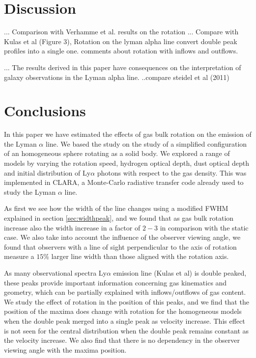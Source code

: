 \documentclass[usenatbib]{mn2e}
\begin{document}
\section{Discussion}
\label{sec:discussion}

... Comparison with Verhamme et al. results on the rotation
... Compare with Kulas et al (Figure 3), Rotation on the lyman alpha
line convert double peak profiles into a single one. comments about
rotation with inflows and outflows.  

... The results derived in this paper have consequences on the
interpretation of galaxy observations in the Lyman alpha line.
..compare steidel et al (2011)



\section{Conclusions}
In this paper we have estimated the effects of gas bulk rotation on
the emission  of the Lyman $\alpha$ line. We based the study on the
study of a simplified configuration of an homogeneous sphere rotating
as a solid body. We explored  a range of models by varying the
rotation speed, hydrogen optical depth, dust optical depth and initial
distribution of Ly$\alpha$ photons with respect to the gas
density. This was implemented in CLARA, a Monte-Carlo
radiative transfer code already used to study the Lyman $\alpha$
line. 

As first we see how the width of the line changes using a modified FWHM
explained in section \ref{sec:widthpeak}, and we found that as gas bulk 
rotation increase also the width increase in a factor of $2-3$ in comparison 
with the static case. We also take into account the influence of the observer 
viewing angle, we found that observers with a line of sight perpendicular  
to the axis of rotation measure a $15\%$ larger line width than those 
aligned with the rotation axis.

As many observational spectra Ly$\alpha$ emission line (Kulas et al)
is double  peaked, these peaks provide important information
concerning gas kinematics and geometry,  which can be partially
explained with inflows/outflows of gas content.  We study the effect
of rotation in the position of this peaks, and we find  that the
position of the maxima does change with rotation for the homogeneous
models when the double peak merged into a single peak as velocity
increase. This effect is not seen for the central distribution when
the double peak  remains constant as the velocity increase. We also
find that there is no dependency in the observer viewing angle with
the maxima position. 
\end{document}
